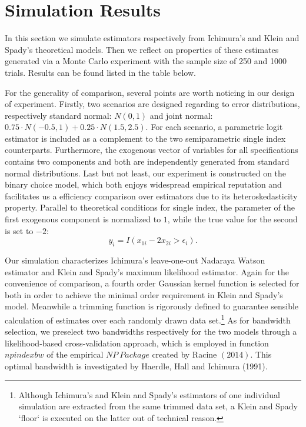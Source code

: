 \documentclass[a4paper]{article}
\begin{document}
\section{Simulation Results}

In this section we simulate estimators respectively from Ichimura's and Klein and Spady's theoretical models. Then we reflect on properties of these estimates generated via a Monte Carlo experiment with the sample size of 250 and 1000 trials. Results can be found listed in the table below.

For the generality of comparison, several points are worth noticing in our design of experiment. Firstly, two scenarios are designed regarding to error distributions, respectively standard normal: $N(0,1)$ and joint normal: $0.75 \cdot N(-0.5,1)+0.25\cdot N(1.5,2.5)$. For each scenario, a parametric logit estimator is included as a complement to the two semiparametric single index counterparts. Furthermore, the exogenous vector of variables for all specifications contains two components and both are independently generated from standard normal distributions. Last but not least, our experiment is constructed on the binary choice model, which both enjoys widespread empirical reputation and facilitates us a efficiency comparison over estimators due to its heteroskedasticity property. Parallel to theoretical conditions for single index, the parameter of the first exogenous component is normalized to $1$, while the true value for the second is set to $-2$:
\begin{equation*}
y_i = I(x_{1i} - 2x_{2i} > \epsilon_i).
\end{equation*}

Our simulation characterizes Ichimura's leave-one-out Nadaraya Watson estimator and Klein and Spady's maximum likelihood estimator. Again for the convenience of comparison, a fourth order Gaussian kernel function is selected for both in order to achieve the minimal order requirement in Klein and Spady's model. Meanwhile a trimming function is rigorously defined to guarantee sensible calculation of estimates over each randomly drawn data set.\footnote{Although Ichimura's and Klein and Spady's estimators of one individual simulation are extracted from the same trimmed data set, a Klein and Spady `floor` is executed on the latter out of technical reason.} As for bandwidth selection, we preselect two bandwidths respectively for the two models through a likelihood-based cross-validation approach, which is employed in function $npindexbw$ of the empirical $NP\ Package$ created by Racine $(2014)$. This optimal bandwidth is investigated by Haerdle, Hall and Ichimura (1991).
\end{document}
